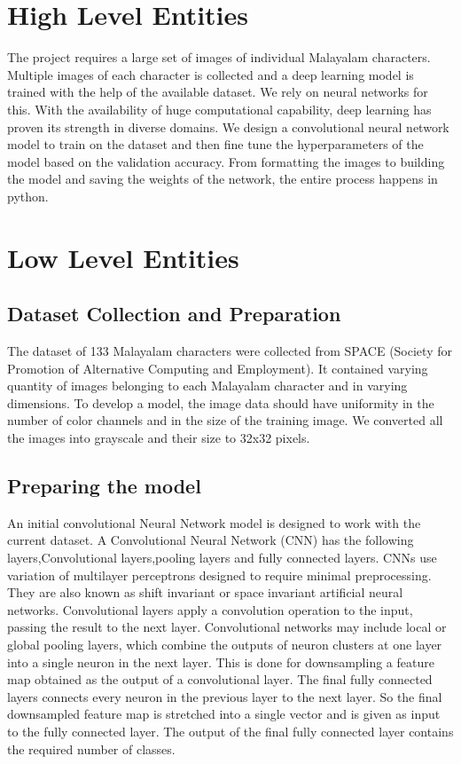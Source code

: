 \documentclass[12pt]{report}
\begin{document}
\section*{High Level Entities}
The project requires a large set of images of individual Malayalam characters. Multiple images of each character is collected and a deep learning model is trained with the help of the available dataset. We rely on neural networks for this. With the availability of huge computational capability, deep learning has proven its strength in diverse domains. We design a convolutional neural network model to train on the dataset and then fine tune the hyperparameters of the model based on the validation accuracy. From formatting the images to building the model and saving the weights of the network, the entire process happens in python. 

\section*{Low Level Entities}
\subsection{Dataset Collection and Preparation}
The dataset of 133 Malayalam characters were collected from SPACE (Society for Promotion of Alternative Computing and Employment). It contained varying quantity of images belonging to each Malayalam character and in varying dimensions. To develop a model, the image data should have uniformity in the number of color channels and in the size of the training image. We converted all the images into grayscale and their size to 32x32 pixels. 
\subsection{Preparing the model}

An initial convolutional Neural Network model is designed to work with the current dataset. A Convolutional Neural Network (CNN) has the following  layers,Convolutional layers,pooling layers and fully connected layers. CNNs use variation of multilayer perceptrons designed to require minimal preprocessing. They are also known as shift invariant or space invariant artificial neural networks. Convolutional layers apply a convolution operation to the input, passing the result to the next layer. Convolutional networks may include local or global pooling layers, which combine the outputs of neuron clusters at one layer into a single neuron in the next layer. This is done for downsampling a feature map obtained as the output of a convolutional layer. The final fully connected layers connects every neuron in the previous layer to the next layer. So the final downsampled feature map is stretched into a single vector and is given as input to the fully connected layer. The output of the final fully connected layer contains the required number of classes. 
\end{document}
